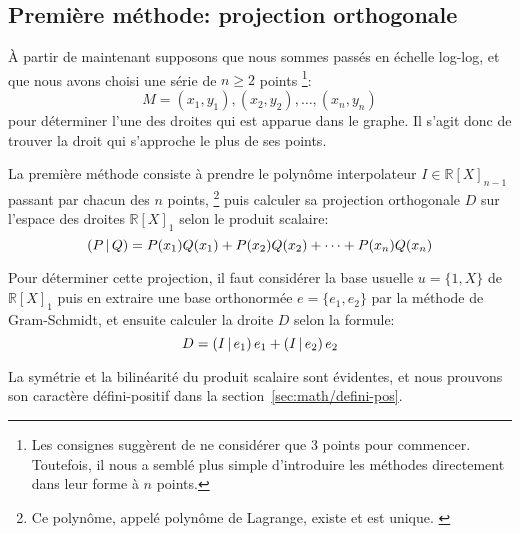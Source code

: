 \subsection{Première méthode: projection orthogonale}

À partir de maintenant supposons que nous sommes passés en échelle log-log,
et que nous avons choisi une série de $n\geq 2$ points%
\footnote{
    Les consignes suggèrent de ne considérer que 3 points pour commencer.
    Toutefois, il nous a semblé plus simple d'introduire les méthodes
    directement dans leur forme à $n$ points.
}:
\[
    M = (x_1,y_1),(x_2,y_2),\ldots,(x_n,y_n)
\]
pour déterminer l'une des droites qui est apparue dans le graphe.
Il s'agit donc de trouver la droit qui s'approche le plus de ses points.

La première méthode consiste à prendre le polynôme interpolateur
$I \in \mathbb{R}[X]_{n-1}$ passant par chacun des $n$ points,%
\footnote{
    Ce polynôme, appelé polynôme de Lagrange, existe et est unique.%
    \cite{lagrange-poly}
}
puis calculer sa projection orthogonale $D$
sur l'espace des droites $\mathbb{R}[X]_1$
selon le produit scalaire:
\begin{equation}
    \left(P\,\middle|\,Q\right) = P(x_1)Q(x_1) + P(x_2)Q(x_2) + \cdots + P(x_n)Q(x_n)
\end{equation}

Pour déterminer cette projection, il faut considérer la base usuelle
$u=\{1,X\}$ de $\mathbb{R}[X]_1$
puis en extraire une base orthonormée $e=\{e_1,e_2\}$ par la méthode
de Gram-Schmidt, et ensuite calculer la droite $D$
selon la formule:
\begin{equation}
    D = \left(I\,\middle|\,e_1\right)e_1 + \left(I\,\middle|\,e_2\right)e_2
\end{equation}

La symétrie et la bilinéarité du produit scalaire sont évidentes,
et nous prouvons son caractère défini-positif dans
la section~\ref{sec:math/defini-pos}.
